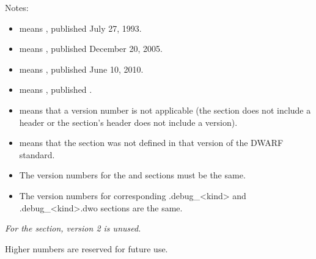 Notes:

\begin{itemize}
\item  {} means , published July 27, 1993.
\item  {} means , published December 20, 2005.
\item  {} means , published June 10, 2010.
\item  {} means , published 
			.
\item  \doublequote{-} means that a version number is not applicable
(the section does not include a header or the section's header does not include a version).

\item  {} means that the section was not defined in that
version of the DWARF standard.

\item  The version numbers for the \dotdebuginfo{} and \dotdebugtypes{}
sections must be the same.

\item  The version numbers for corresponding .debug\_<kind> and .debug\_<kind>.dwo 
sections are the same.

\end{itemize}

\textit{For the \dotdebugframe{} section, version 2 is unused.}

Higher numbers are reserved for future use.


